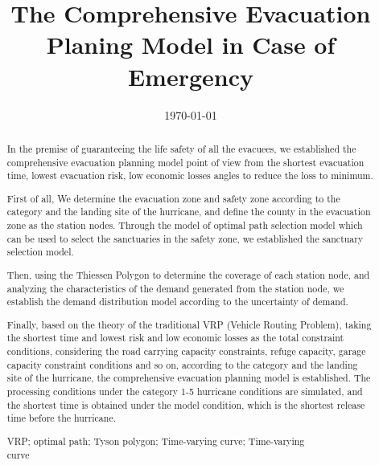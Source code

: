 \documentclass{mcmthesis}
\title{\large The Comprehensive Evacuation Planing Model in Case of Emergency}
\author{ }
\date{\today}
\begin{document}
\begin{abstract}

  In the premise of guaranteeing the life safety of all the evacuees, we established the comprehensive evacuation planning model point of view from the shortest evacuation time, lowest evacuation risk, low economic losses angles to reduce the loss to minimum.

  First of all, We determine the evacuation zone and safety zone according to the category and the landing site of the hurricane, and define the county in the evacuation zone as the station nodes. Through the model of optimal path selection model which can be used to select the sanctuaries in the safety zone, we established the sanctuary selection model.

  Then, using the Thiessen Polygon to determine the coverage of each station node, and analyzing the characteristics of the demand generated from the station node, we establish the demand distribution model according to the uncertainty of demand.

  Finally, based on the theory of the traditional VRP (Vehicle Routing Problem), taking the shortest time and lowest risk and low economic losses as the total constraint conditions, considering the road carrying capacity constraints, refuge capacity, garage capacity constraint conditions and so on, according to the category and the landing site of the hurricane, the comprehensive evacuation planning model is established. The processing conditions under the category 1-5 hurricane conditions are simulated, and the shortest time is obtained under the model condition, which is the shortest release time before the hurricane.


  \begin{keywords}
    VRP; optimal path; Tyson polygon; Time-varying curve; Time-varying \\  curve
  \end{keywords}
\end{abstract}
\maketitle
\newpage                                                          %
\begin{adjustwidth}{-1cm}{0cm}

  \setcounter{tocdepth}{3}
  \thispagestyle{empty}
  \tableofcontents                                                  %

\end{adjustwidth}
\end{document}
